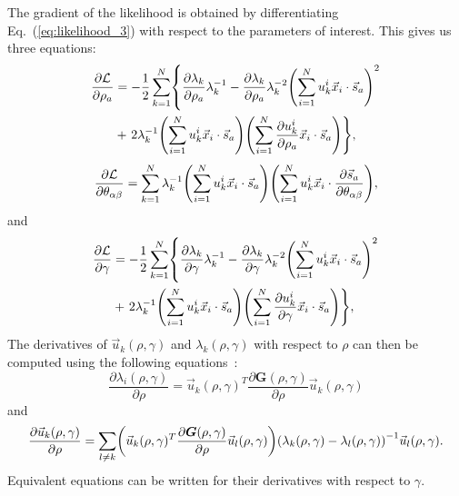 \documentclass[preprint,amsmath,amssymb,superscriptaddress,showpacs,pre]{revtex4-1}
\let\originalleft\left
\let\originalright\right
\renewcommand{\left}{\mathopen{}\mathclose\bgroup\originalleft}
\renewcommand{\right}{\aftergroup\egroup\originalright}
\def\vx{\vec x}
\newcommand{\vsa}{\vec{s}_a}
\begin{document}
The gradient of the likelihood is obtained by differentiating Eq.~(\ref{eq:likelihood_3}) with respect to the parameters of interest. 
This gives us  three equations: 
\begin{equation}
	\begin{split}
		\frac{\partial \mathcal{L}}{\partial\rho_a} &= -\frac 1 2 \sum_{k=1}^N \left\{ \frac{\partial\lambda_k}{\partial\rho_a}\lambda_k^{-1} - \frac{\partial\lambda_k}{\partial\rho_a} \lambda_k^{-2}\left(\sum_{i=1}^N u_{k}^i\vx_i\cdot\vsa\right)^2 \right. \\
		&+ \left. 2\lambda_k^{-1} \left(\sum_{i=1}^N u_k^i\vx_i\cdot\vsa\right) \left(\sum_{i=1}^N \frac{\partial u_k^i}{\partial\rho_a} \vx_i\cdot\vsa\right) \right\}, 
	\end{split}
	\label{eq:gradlikelihood_1}
\end{equation}
\begin{equation}
	\frac{\partial \mathcal{L}}{\partial\theta_{\alpha\beta}} = \sum_{k=1}^N \lambda_k^{-1} \left(\sum_{i=1}^N u_k^i\vx_i\cdot\vsa\right) \left(\sum_{i=1}^N u_k^i \vx_i\cdot\frac{\partial \vsa}{\partial\theta_{\alpha\beta}}\right),
	\label{eq:gradlikelihood_2}
\end{equation}
and
\begin{equation}
	\begin{split}
		\frac{\partial \mathcal{L}}{\partial\gamma} &= -\frac 1 2 \sum_{k=1}^N \left\{ \frac{\partial\lambda_k}{\partial\gamma}\lambda_k^{-1} - \frac{\partial\lambda_k}{\partial\gamma} \lambda_k^{-2}\left(\sum_{i=1}^N u_{k}^i\vx_i\cdot\vsa\right)^2 \right. \\
		&+ \left. 2\lambda_k^{-1} \left(\sum_{i=1}^N u_k^i\vx_i\cdot\vsa\right) \left(\sum_{i=1}^N \frac{\partial u_k^i}{\partial\gamma} \vx_i\cdot\vsa\right) \right\}, 
	\end{split}
	\label{eq:gradlikelihood_3}
\end{equation}
The derivatives of $\vec{u}_k(\rho,\gamma)$ and $\lambda_k(\rho,\gamma)$ with respect to $\rho$ can then be computed using the following equations~\cite{matrix_cook_book}: 
\begin{equation}
	\frac{\partial\lambda_i(\rho,\gamma)}{\partial\rho} = \vec{u}_k(\rho,\gamma)^T\frac{\partial\bm{G}(\rho,\gamma)}{\partial\rho}\vec{u}_k(\rho,\gamma)
	\label{eq:grad_eigval}
\end{equation}
and
\begin{equation}
	\frac{\partial \vec{u}_k(\rho,\gamma)}{\partial\rho} = \sum_{l\neq k} \left( \vec{u}_k(\rho,\gamma)^T\frac{\partial\bm{G}(\rho,\gamma)}{\partial\rho}\vec{u}_l(\rho,\gamma) \right) \left(\lambda_k(\rho,\gamma) - \lambda_l(\rho,\gamma)\right)^{-1} \vec{u}_l(\rho,\gamma).
	\label{eq:grad_eigvec}
\end{equation}
Equivalent equations can be written for their derivatives with respect to $\gamma$. 
\end{document}
